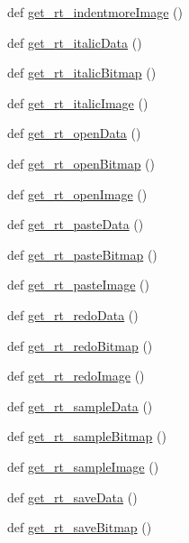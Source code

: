 \begin{DoxyCompactItemize}
\item 
def \hyperlink{namespaceimages_a8bfc6d18301fb3b884715866edaac635}{get\+\_\+rt\+\_\+indentmore\+Image} ()
\item 
def \hyperlink{namespaceimages_a912618bf10b2cb0da48f4e793c51fad0}{get\+\_\+rt\+\_\+italic\+Data} ()
\item 
def \hyperlink{namespaceimages_accbbafcb62b12112266d9912021c8bac}{get\+\_\+rt\+\_\+italic\+Bitmap} ()
\item 
def \hyperlink{namespaceimages_abb24502023e84e99516d15059c26371d}{get\+\_\+rt\+\_\+italic\+Image} ()
\item 
def \hyperlink{namespaceimages_addfd58d6ab4de5a4b3eca7b6f057d234}{get\+\_\+rt\+\_\+open\+Data} ()
\item 
def \hyperlink{namespaceimages_a81c594953339efc7f92c04aa49ba9d37}{get\+\_\+rt\+\_\+open\+Bitmap} ()
\item 
def \hyperlink{namespaceimages_a82d1ce2172b3d643c512f8711182e732}{get\+\_\+rt\+\_\+open\+Image} ()
\item 
def \hyperlink{namespaceimages_add410f080839e1241e8a9c07e2d46490}{get\+\_\+rt\+\_\+paste\+Data} ()
\item 
def \hyperlink{namespaceimages_a4c113665b231ff3ffc57a7e599235225}{get\+\_\+rt\+\_\+paste\+Bitmap} ()
\item 
def \hyperlink{namespaceimages_aafce09d643eafa16868d813270beb9e3}{get\+\_\+rt\+\_\+paste\+Image} ()
\item 
def \hyperlink{namespaceimages_a556fd7418509ce5167c7298675f08f76}{get\+\_\+rt\+\_\+redo\+Data} ()
\item 
def \hyperlink{namespaceimages_a94ee2c1c9ec4237ce584c034da68d6ea}{get\+\_\+rt\+\_\+redo\+Bitmap} ()
\item 
def \hyperlink{namespaceimages_ae6da2122e70516d8aa6ff0f4e4141ade}{get\+\_\+rt\+\_\+redo\+Image} ()
\item 
def \hyperlink{namespaceimages_aad3c19cd4a044581a21b4b44a2d51f64}{get\+\_\+rt\+\_\+sample\+Data} ()
\item 
def \hyperlink{namespaceimages_a2c3d2873dd88908c562257fc622df4c8}{get\+\_\+rt\+\_\+sample\+Bitmap} ()
\item 
def \hyperlink{namespaceimages_a6adda47fb7faee6db520b6b0e6fbdac1}{get\+\_\+rt\+\_\+sample\+Image} ()
\item 
def \hyperlink{namespaceimages_ab57eaafe3165ec3e04e68b392b4e32af}{get\+\_\+rt\+\_\+save\+Data} ()
\item 
def \hyperlink{namespaceimages_aad395629cb6cf3619cbf6d101bd71240}{get\+\_\+rt\+\_\+save\+Bitmap} ()

\end{DoxyCompactItemize}
